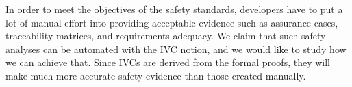 In order to meet the objectives of the safety standards, developers have to put a lot of manual effort into providing acceptable evidence such as assurance cases, traceability matrices, and requirements adequacy. We claim that such safety analyses can be automated with the IVC notion, and we would like to study how we can achieve that. Since IVCs are derived from the formal proofs, they will make much more accurate safety evidence than those created manually.